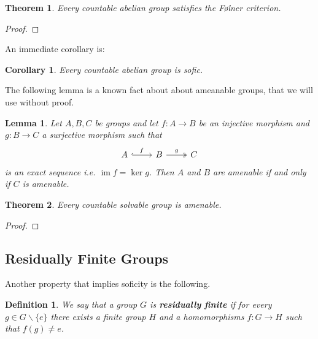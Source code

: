 \documentclass[titlepage, a4paper]{article}
\DeclareMathOperator{\im}{im}
\newtheorem{theorem}{Theorem}
\newtheorem{definition}{Definition}
\newtheorem{lemma}{Lemma}
\newtheorem{corollary}{Corollary}
\theoremstyle{remark}
\begin{document}
    \begin{theorem}\label{thm:countable_abelian_folner}
        Every countable abelian group satisfies the Følner criterion. 
    \end{theorem}
    \begin{proof}
        
    \end{proof}
    An immediate corollary is:
    \begin{corollary}
    	Every countable abelian group is sofic.	
    \end{corollary}
	The following lemma is a known fact about about ameanable groups, that we will use without proof.
    \begin{lemma}
        \label{lem:amenable_short_exact_sequence}
        Let $A, B, C$ be groups and let $f: A\to B$ be an injective morphism and $g:B\to C$ a surjective morphism such that 
        \[\begin{tikzcd}
            A \arrow[r, "f", hook] & B \arrow[r, "g", two heads] & C
        \end{tikzcd}\]
        is an exact sequence i.e. $\im f = \ker g$. Then $A$ and $B$ are amenable if and only if $C$ is amenable.
    \end{lemma}

    \begin{theorem}
        Every countable solvable group is amenable. 
    \end{theorem}
    \begin{proof}
        
    \end{proof}

\subsection{Residually Finite Groups}

Another property that implies soficity is the following.

\begin{definition}\cite{noauthor_residually_2018} \label{def:res_fin}
	We say that a group $G$ is \textbf{residually finite} if for every $g \in G\backslash\{e\}$ there exists a finite group $H$ and a homomorphisms $f:G \to H$ such that $f(g) \ne e$.
\end{definition}
\end{document}
